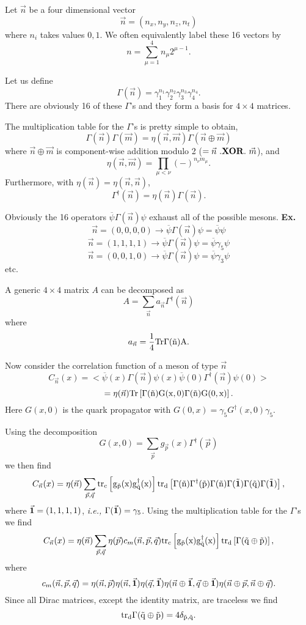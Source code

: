 \documentclass[prd,12pt,superscriptaddress,tightenlines,nofootinbib]{revtex4}
\def\Tr{\rm Tr}
\def\trd{\rm tr_d}
\def\trc{\rm tr_c}
\begin{document}
    



Let $\vec n$ be a four dimensional vector
$$ \vec n = (n_x, n_y, n_z, n_t) $$
where $n_i $ takes values $0, 1.$ We often equivalently label these 16
vectors by 
$$ n = \sum_{\mu = 1}^4 n_{\mu} 2^{\mu-1}. $$

Let us define 
$$\Gamma(\vec n) = \gamma_1^{n_1}\gamma_2^{n_2}\gamma_3^{n_3}\gamma_4^{n_4}.$$
There are obviously 16 of these $\Gamma$'s and they form a basis for
$ 4 \times 4 $ matrices.

The multiplication table for the $\Gamma$'s is pretty simple to obtain,
$$ \Gamma(\vec n)\Gamma(\vec m) = 
   \eta(\vec n,\vec m)\Gamma(\vec n \oplus \vec m)$$
where $\vec n \oplus \vec m$ is component-wise addition modulo 2 ($ = \vec n 
~.{\bf XOR}.~ \vec m$), and 
$$ \eta(\vec n, \vec m) = \prod_{\mu < \nu}(-)^{n_\nu m_\mu}. $$
Furthermore, with $\eta(\vec n) = \eta(\vec n,\vec n)$,
$$ \Gamma^\dagger(\vec n) = \eta(\vec n) \Gamma(\vec n). $$

Obviously the 16 operators $\overline \psi \Gamma(\vec n)\psi $
exhaust all of the possible mesons.
\smallskip
{\bf Ex.}
$$\vec n = (0, 0, 0, 0) \to 
 \overline \psi \Gamma(\vec n) \psi = \overline \psi \psi$$
$$\vec n = (1, 1, 1, 1) \to 
 \overline \psi \Gamma(\vec n) \psi = \overline \psi \gamma_5 \psi$$
$$\vec n = (0, 0, 1, 0) \to 
 \overline \psi \Gamma(\vec n) \psi = \overline \psi \gamma_3 \psi$$
etc.

A generic $4 \times 4$ matrix $A$ can be decomposed as
$$ A = \sum_{\vec n} a_{\vec n}\Gamma^\dagger(\vec n) $$
where 
$$ a_{\vec n} = {1 \over 4} \Tr \Gamma(\vec n)A. $$

Now consider the correlation function of a meson of type $\vec n$
$$ C_{\vec n} (x) = < \overline \psi(x) \Gamma(\vec n) \psi(x)
 \overline \psi(0) \Gamma^\dagger(\vec n) \psi(0)> $$
$$ ~~~~~~~ =\eta(\vec n) \Tr \left[ \Gamma(\vec n) G(x,0) 
 \Gamma(\vec n) G(0,x) \right]. $$
Here $G(x,0)$ is the quark propagator with $G(0,x) = \gamma_5 
G^\dagger (x,0) \gamma_5$.

Using the decomposition
$$ G(x,0) = \sum_{\vec p} g_{\vec p}(x) \Gamma^\dagger(\vec p)$$
we then find
$$ C_{\vec n} (x) = \eta(\vec n) \sum_{\vec p,\vec q} \trc \left[ 
 g_{\vec p}(x)  g_{\vec q}^\dagger(x) \right] \trd \left[ \Gamma(\vec n) 
 \Gamma^\dagger(\vec p)  \Gamma(\vec n)  \Gamma(\vec {\bf 1}) 
 \Gamma(\vec q) \Gamma(\vec {\bf 1}) \right], $$
where $\vec {\bf 1} = (1,1,1,1)$, {\it i.e.,} $\Gamma(\vec {\bf 1}) =
\gamma_5$. Using the multiplication table for the $\Gamma$'s we find
$$ C_{\vec n} (x) = \eta(\vec n) \sum_{\vec p,\vec q} \eta(\vec p) 
 c_m(\vec n, \vec p, \vec q) \trc \left[ g_{\vec p}(x) g_{\vec q}^\dagger(x) 
 \right] \trd \left[ \Gamma(\vec q\oplus\vec p) \right], $$
where 
$$ c_m(\vec n, \vec p, \vec q) = \eta(\vec n,\vec p) \eta(\vec n,
 \vec {\bf 1}) \eta(\vec q, \vec {\bf 1}) \eta(\vec n \oplus \vec {\bf 1},
 \vec q \oplus \vec {\bf 1}) \eta(\vec n \oplus \vec p, 
 \vec n \oplus \vec q). $$
Since all Dirac matrices, except the identity matrix, are traceless we find
$$ \trd \Gamma(\vec q\oplus \vec p) = 4 \delta_{ \vec p, \vec q}. $$ 
\end{document}
